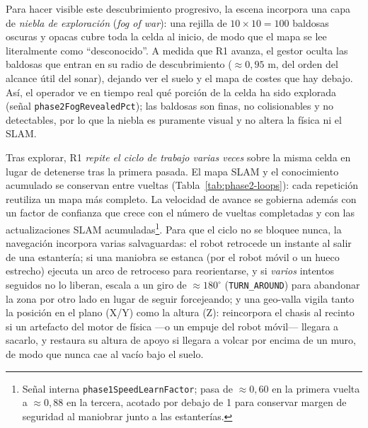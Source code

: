 Para hacer visible este descubrimiento progresivo, la escena incorpora una capa de
\emph{niebla de exploración} (\emph{fog of war}): una rejilla de \(10\times10=100\)
baldosas oscuras y opacas cubre toda la celda al inicio, de modo que el mapa se lee
literalmente como ``desconocido''. A medida que R1 avanza, el gestor oculta las
baldosas que entran en su radio de descubrimiento (\(\approx0{,}95\) m, del orden
del alcance útil del sonar), dejando ver el suelo y el mapa de costes que hay
debajo. Así, el operador ve en tiempo real qué porción de la celda ha sido
explorada (señal \texttt{phase2FogRevealedPct}); las baldosas son finas, no
colisionables y no detectables, por lo que la niebla es puramente visual y no
altera la física ni el SLAM.

Tras explorar, R1 \emph{repite el ciclo de trabajo varias veces} sobre la misma
celda en lugar de detenerse tras la primera pasada. El mapa SLAM y el conocimiento
acumulado se conservan entre vueltas (Tabla~\ref{tab:phase2-loops}): cada repetición
reutiliza un mapa más completo. La velocidad de avance se gobierna además con un
factor de confianza que crece con el número de vueltas completadas y con las
actualizaciones SLAM acumuladas\footnote{Señal interna
\texttt{phase1SpeedLearnFactor}; pasa de \(\approx 0{,}60\) en la primera vuelta a
\(\approx 0{,}88\) en la tercera, acotado por debajo de 1 para conservar margen de
seguridad al maniobrar junto a las estanterías.}. Para que el ciclo no se bloquee
nunca, la navegación incorpora varias salvaguardas: el robot retrocede un instante
al salir de una estantería; si una maniobra se estanca (por el robot móvil o un
hueco estrecho) ejecuta un arco de retroceso para reorientarse, y si \emph{varios}
intentos seguidos no lo liberan, escala a un giro de \(\approx180^\circ\)
(\texttt{TURN\_AROUND}) para abandonar la zona por otro lado en lugar de seguir
forcejeando; y una geo-valla vigila tanto la posición en el plano (X/Y) como la
altura (Z): reincorpora el chasis al recinto si un artefacto del motor de física
—o un empuje del robot móvil— llegara a sacarlo, y restaura su altura de apoyo si
llegara a volcar por encima de un muro, de modo que nunca cae al vacío bajo el
suelo.

